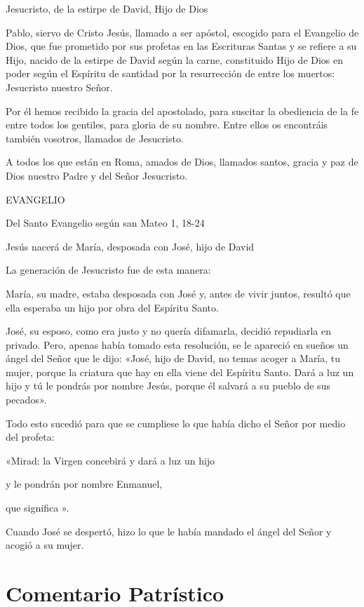 Jesucristo, de la estirpe de David, Hijo de Dios

Pablo, siervo de Cristo Jesús, llamado a ser apóstol, escogido para el
Evangelio de Dios, que fue prometido por sus profetas en las Escrituras
Santas y se refiere a su Hijo, nacido de la estirpe de David según la
carne, constituido Hijo de Dios en poder según el Espíritu de santidad
por la resurrección de entre los muertos: Jesucristo nuestro Señor.

Por él hemos recibido la gracia del apostolado, para suscitar la
obediencia de la fe entre todos los gentiles, para gloria de su nombre.
Entre ellos os encontráis también vosotros, llamados de Jesucristo.

A todos los que están en Roma, amados de Dios, llamados santos, gracia y
paz de Dios nuestro Padre y del Señor Jesucristo.

EVANGELIO

Del Santo Evangelio según san Mateo 1, 18-24

Jesús nacerá de María, desposada con José, hijo de David

La generación de Jesucristo fue de esta manera:

María, su madre, estaba desposada con José y, antes de vivir juntos,
resultó que ella esperaba un hijo por obra del Espíritu Santo.

José, su esposo, como era justo y no quería difamarla, decidió
repudiarla en privado. Pero, apenas había tomado esta resolución, se le
apareció en sueños un ángel del Señor que le dijo: «José, hijo de David,
no temas acoger a María, tu mujer, porque la criatura que hay en ella
viene del Espíritu Santo. Dará a luz un hijo y tú le pondrás por nombre
Jesús, porque él salvará a su pueblo de sus pecados».

Todo esto sucedió para que se cumpliese lo que había dicho el Señor por
medio del profeta:

«Mirad: la Virgen concebirá y dará a luz un hijo

y le pondrán por nombre Enmanuel,

que significa ».

Cuando José se despertó, hizo lo que le había mandado el ángel del Señor
y acogió a su mujer.



\section{Comentario Patrístico}

